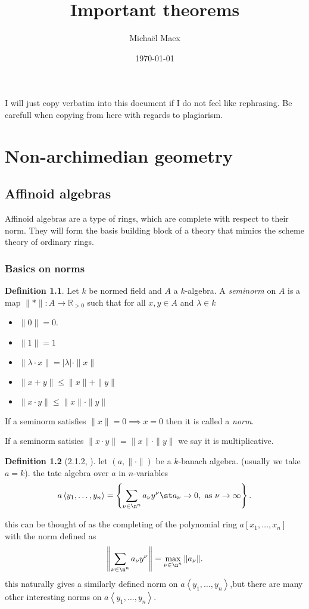 \documentclass[a4paper]{report}
\author{Micha\"el Maex}
\date{\today}
\title{Important theorems}
\newcommand{\R}{\mathbb{R}}
\theoremstyle{definition}
\newtheorem*{definition}{Definition}
\begin{document}
\maketitle
{\color{red} I will just copy verbatim into this document if I do not feel like rephrasing. Be carefull when copying from here with regards to plagiarism.}
\tableofcontents

\pagebreak
\chapter{Non-archimedian geometry} \label{chap:non-archimedian_geometry}
\section{Affinoid algebras} \label{sec:affinoid_algebras}
Affinoid algebras are a type of rings, which are complete with respect to their norm. 
They will form the basis building block of a theory that mimics the scheme theory of ordinary rings. 

\subsection{Basics on norms} \label{sec:basics_on_norms}
\begin{definition}
	Let $k$ be normed field and $A$ a $k$-algebra. 
	A \emph{seminorm} on $A$ is a map $\|*\|:A \to \R_{> 0}$ such that for all $x, y \in A$ and $\lambda \in k$
	\begin{itemize}
		\item  $\|0\| = 0$. 
		\item $\|1\| = 1$ 
		\item $\|\lambda \cdot x\| = |\lambda| \cdot \|x\|$
		\item $\|x + y\| \le \|x\| + \|y\|$
		\item $\|x \cdot y\| \le \|x\| \cdot  \|y\|$
	\end{itemize}
	

	If a seminorm satisfies $\|x\| = 0 \implies x = 0$ then it is called a \emph{norm}.

	If a seminorm satisies $\|x \cdot  y\| = \|x\| \cdot \|y\|$ we say it is multiplicative. 

\end{definition}

\begin{definition}
	[2.1.2, \cite{conrad2008several}]
	let $(a, \|\cdot\|)$ be a $k$-banach algebra. (usually we take $a = k$). 
	the tate algebra over $a$ in $n$-variables \[
	a \left<y_1, \ldots, y_n \right> = \left\{\sum_{\nu \in \n^{n}}^{} a_\nu y^{\nu} \st a_\nu \to 0, \text{ as } \nu \to \infty\right\} 
	.\] 

	this can be thought of as the completing of the polynomial ring $a[x_1, \ldots, x_n]$ with the norm defined as \[
	\left\| \sum_{\nu \in \n^{n}} a_\nu y^{\nu}\right\| = \max_{\nu \in \n^{n}} \|a_\nu\|
	.\] 
	this naturally gives a similarly defined norm on $a\left<y_1, \ldots, y_n \right>$,but there are many other interesting norms on $a \left<y_1, \ldots, y_n \right>$. 
\end{definition}
\end{document}
